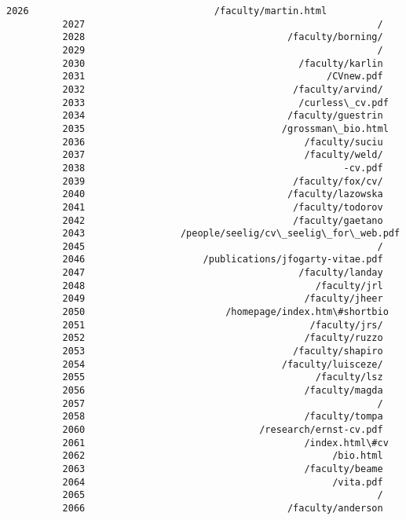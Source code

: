 \documentclass[11pt]{article}
\begin{document}
\begin{Verbatim}[commandchars=\\\{\}]
          2026                                 /faculty/martin.html
          2027                                                    /
          2028                                    /faculty/borning/
          2029                                                    /
          2030                                      /faculty/karlin
          2031                                           /CVnew.pdf
          2032                                     /faculty/arvind/
          2033                                      /curless\_cv.pdf
          2034                                    /faculty/guestrin
          2035                                   /grossman\_bio.html
          2036                                       /faculty/suciu
          2037                                       /faculty/weld/
          2038                                              -cv.pdf
          2039                                     /faculty/fox/cv/
          2040                                    /faculty/lazowska
          2041                                     /faculty/todorov
          2042                                     /faculty/gaetano
          2043                 /people/seelig/cv\_seelig\_for\_web.pdf
          2045                                                    /
          2046                     /publications/jfogarty-vitae.pdf
          2047                                      /faculty/landay
          2048                                         /faculty/jrl
          2049                                       /faculty/jheer
          2050                         /homepage/index.htm\#shortbio
          2051                                        /faculty/jrs/
          2052                                       /faculty/ruzzo
          2053                                     /faculty/shapiro
          2054                                   /faculty/luisceze/
          2055                                         /faculty/lsz
          2056                                       /faculty/magda
          2057                                                    /
          2058                                       /faculty/tompa
          2060                               /research/ernst-cv.pdf
          2061                                       /index.html\#cv
          2062                                            /bio.html
          2063                                       /faculty/beame
          2064                                            /vita.pdf
          2065                                                    /
          2066                                    /faculty/anderson

\end{Verbatim}
\end{document}
